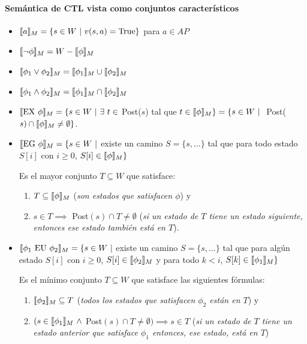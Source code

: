\paragraph{Semántica de CTL vista como conjuntos característicos}
\begin{itemize}
\item $\llbracket a \rrbracket_{M} = \{s \in W ~|~ v(s,a) = \text{True} \}$ para $a\in AP$
\item $\llbracket \lnot\phi \rrbracket_{M} = W - \llbracket \phi \rrbracket_{M}$
\item $\llbracket \phi_1\lor\phi_2 \rrbracket_{M} = \llbracket \phi_1 \rrbracket_{M} \cup \llbracket \phi_2 \rrbracket_{M}$
\item $\llbracket \phi_1\land\phi_2 \rrbracket_{M} = \llbracket \phi_1 \rrbracket_{M} \cap \llbracket \phi_2 \rrbracket_{M}$
\item $\llbracket \text{EX }\phi \rrbracket_{M} = \{s\in W~|~\exists~t\in$ Post($s$) tal que $t\in\llbracket \phi \rrbracket_{M}\} = \{ s \in W~|~$ Post($s) \cap \llbracket \phi \rrbracket_{M} \neq\emptyset\}$.
\item $\llbracket \text{EG }\phi \rrbracket_{M} = \{s\in W~|$ existe un camino $S=\{s,\dots\}$ tal que para todo estado $S[i]$ con $i\geq 0$, $S[i]\in\llbracket \phi \rrbracket_{M} \}$

Es el mayor conjunto $T\subseteq W$ que satisface:
\begin{enumerate}
\item $T\subseteq\llbracket \phi \rrbracket_{M}$ (\textit{son estados que satisfacen $\phi$}) y
\item $s\in T \implies$ Post$(s)\cap T \neq\emptyset$ (\textit{si un estado de $T$ tiene un estado siguiente, entonces ese estado también está en $T$}).
\end{enumerate}

\item $\llbracket \phi_1 \text{ EU }\phi_2 \rrbracket_{M} = \{s\in W~|$ existe un camino $S=\{s,\dots\}$ tal que para algún estado $S[i]$ con $i\geq 0$, $S[i]\in\llbracket \phi_2 \rrbracket_{M}$ y para todo $k < i$, $S[k]\in\llbracket \phi_1 \rrbracket_{M} \}$

Es el mínimo conjunto $T\subseteq W$ que satisface las siguientes fórmulas:
\begin{enumerate}
	\item $\llbracket \phi_2 \rrbracket_{M}\subseteq T$ (\textit{todos los estados que satisfacen $\phi_2$ están en $T$}) y
	\item $(s\in\llbracket \phi_1 \rrbracket_{M}~\land$ Post$(s)\cap T \neq\emptyset) \implies s\in T$ (\textit{si un estado de $T$ tiene un estado anterior que satisface $\phi_1$ entonces, ese estado, está en $T$})
\end{enumerate}
\end{itemize}

